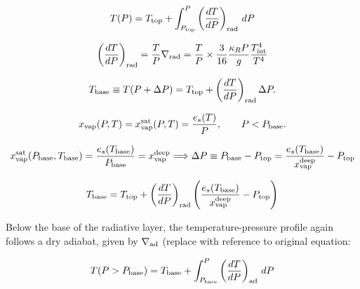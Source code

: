 \documentclass[11pt]{ucscthesisbs}
\begin{document}
\begin{equation}
	T(P) = T_{\rm top} + \int_{P_{\rm top}}^P\left(\frac{dT}{dP}\right)_{\rm rad}\,d P
\end{equation}

\begin{equation}
  \left(\frac{dT}{dP}\right)_{\rm rad}=\frac{T}{P}\nabla_{\rm rad} = \frac{T}{P}\times\frac{3}{16}\frac{\kappa_R P}{g}\frac{T_{\rm int}^4}{T^4}
\end{equation}

\begin{equation}
	T_{\rm base}\equiv T(P+\Delta P) = T_{\rm top} + \left(\frac{dT}{dP}\right)_{\rm rad}\Delta P.
\end{equation}

\begin{equation}
	x_{\rm vap}(P, T) = x_{\rm vap}^{\rm sat}(P, T) = \frac{e_s(T)}{P}, \qquad P<P_{\rm base}.
\end{equation}

\begin{equation}
x_{\rm vap}^{\rm sat}(P_{\rm base}, T_{\rm base}) = \frac{e_s(T_{\rm base})}{P_{\rm base}}=x_{\rm vap}^{\rm deep}
\Longrightarrow \Delta P \equiv P_{\rm base}-P_{\rm top} = \frac{e_s(T_{\rm base})}{x_{\rm vap}^{\rm deep}} - P_{\rm top}
\end{equation}

\begin{equation}
	T_{\rm base} = T_{\rm top} + \left(\frac{dT}{dP}\right)_{\rm rad}\left(\frac{e_s(T_{\rm base})}{x_{\rm vap}^{\rm deep}} - P_{\rm top}\right)
\end{equation}

Below the base of the radiative layer, the temperature-pressure profile again follows a dry adiabat, given by $\nabla_{\rm ad}$ (replace with reference to original equation:

\begin{equation}
T(P>P_{\rm base}) = T_{\rm base} + \int_{P_{\rm base}}^P\left(\frac{dT}{dP}\right)_{\rm ad}\,d P
\end{equation}
\end{document}

